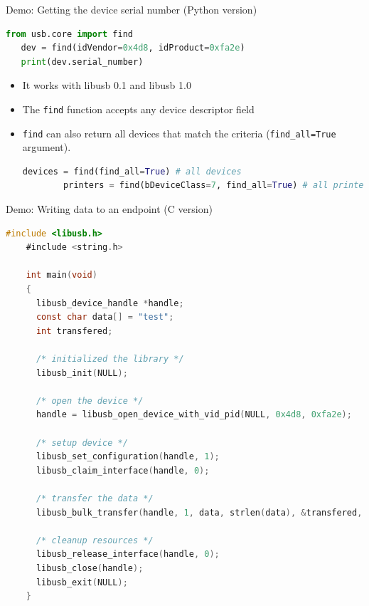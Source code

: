 \documentclass[pdf]{beamer}
\begin{document}
\begin{frame}[fragile]{Demo: Getting the device serial number (Python version)}
  \small
  \pause
  \begin{lstlisting}[language=Python]
   from usb.core import find
   dev = find(idVendor=0x4d8, idProduct=0xfa2e)
   print(dev.serial_number)
  \end{lstlisting}

  \begin{itemize}
    \small
    \pause
    \item It works with libusb 0.1 and libusb 1.0
    \pause
    \item The \texttt{find} function accepts any device descriptor field
    \pause
    \item \texttt{find} can also return all devices that match the criteria
      (\texttt{find\_all=True} argument).
      \begin{lstlisting}[language=Python]
        devices = find(find_all=True) # all devices
        printers = find(bDeviceClass=7, find_all=True) # all printers
      \end{lstlisting}
  \end{itemize}
\end{frame}

\begin{frame}[fragile]{Demo: Writing data to an endpoint (C version)}
  \tiny
  \pause
  \begin{lstlisting}[language=C]
    #include <libusb.h>
    #include <string.h>

    int main(void)
    {
      libusb_device_handle *handle;
      const char data[] = "test";
      int transfered;

      /* initialized the library */
      libusb_init(NULL);

      /* open the device */
      handle = libusb_open_device_with_vid_pid(NULL, 0x4d8, 0xfa2e);

      /* setup device */
      libusb_set_configuration(handle, 1);
      libusb_claim_interface(handle, 0);

      /* transfer the data */
      libusb_bulk_transfer(handle, 1, data, strlen(data), &transfered, 1000);

      /* cleanup resources */
      libusb_release_interface(handle, 0);
      libusb_close(handle);
      libusb_exit(NULL);
    }
  \end{lstlisting}
\end{frame}
\end{document}
